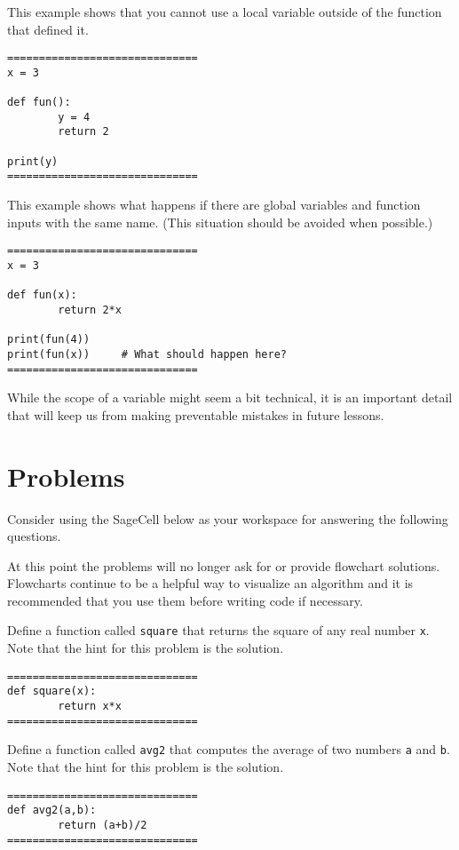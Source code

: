 \documentclass{ximera}
\begin{document}
This example shows that you cannot use a local variable outside of the function that defined it.

\begin{verbatim}
==============================
x = 3

def fun():
        y = 4
        return 2

print(y)
==============================
\end{verbatim}

This example shows what happens if there are global variables and function inputs with the same name. (This situation should be avoided when possible.)

\begin{verbatim}
==============================
x = 3

def fun(x):
        return 2*x

print(fun(4))
print(fun(x))     # What should happen here?
==============================
\end{verbatim}

While the scope of a variable might seem a bit technical, it is an important detail that will keep us from making preventable mistakes in future lessons.

\section{Problems}

Consider using the SageCell below as your workspace for answering the following questions. 

At this point the problems will no longer ask for or provide flowchart solutions. Flowcharts continue to be a helpful way to visualize an algorithm and it is recommended that you use them before writing code if necessary. 

\begin{question}
	Define a function called \verb|square| that returns the square of any real number \verb|x|. Note that the hint for this problem is the solution.
	\begin{hint}
\begin{verbatim}
==============================
def square(x):
        return x*x
==============================
\end{verbatim}
	\end{hint}
\end{question}

\begin{question}
	Define a function called \verb|avg2| that computes the average of two numbers \verb|a| and \verb|b|. Note that the hint for this problem is the solution.
	\begin{hint}
\begin{verbatim}
==============================
def avg2(a,b):
        return (a+b)/2
==============================
\end{verbatim}
	\end{hint}
\end{question}
\end{document}
